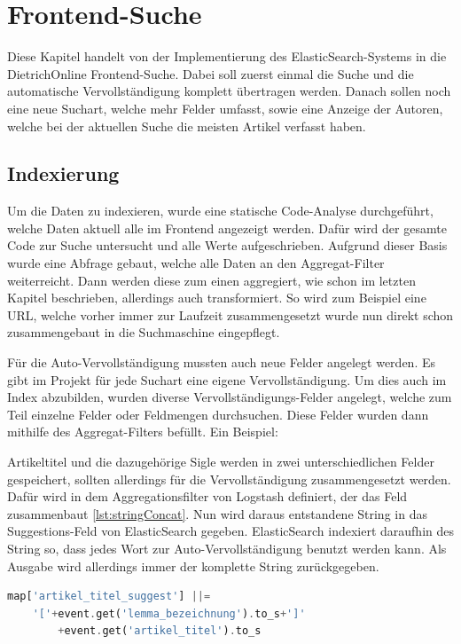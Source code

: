 \chapter{Frontend-Suche}

Diese Kapitel handelt von der Implementierung des ElasticSearch-Systems in die DietrichOnline Frontend-Suche. Dabei soll zuerst einmal die Suche und die automatische Vervollständigung komplett übertragen werden. Danach sollen noch eine neue Suchart, welche mehr Felder umfasst, sowie eine Anzeige der Autoren, welche bei der aktuellen Suche die meisten Artikel verfasst haben.

\section{Indexierung}

Um die Daten zu indexieren, wurde eine statische Code-Analyse durchgeführt, welche Daten aktuell alle im Frontend angezeigt werden. Dafür wird der gesamte Code zur Suche untersucht und alle Werte aufgeschrieben. Aufgrund dieser Basis wurde eine Abfrage gebaut, welche alle Daten an den Aggregat-Filter weiterreicht. Dann werden diese zum einen aggregiert, wie schon im letzten Kapitel beschrieben, allerdings auch transformiert. So wird zum Beispiel eine URL, welche vorher immer zur Laufzeit zusammengesetzt wurde nun direkt schon zusammengebaut in die Suchmaschine eingepflegt. 

Für die Auto-Vervollständigung mussten auch neue Felder angelegt werden. Es gibt im Projekt für jede Suchart eine eigene Vervollständigung. Um dies auch im Index abzubilden, wurden diverse Vervollständigungs-Felder angelegt, welche zum Teil einzelne Felder oder Feldmengen durchsuchen. Diese Felder wurden dann mithilfe des Aggregat-Filters befüllt. Ein Beispiel:

Artikeltitel und die dazugehörige Sigle werden in zwei unterschiedlichen Felder gespeichert, sollten allerdings für die Vervollständigung zusammengesetzt werden.
Dafür wird in dem Aggregationsfilter von Logstash definiert, der das Feld zusammenbaut \ref{lst:stringConcat}. Nun wird daraus entstandene String in das Suggestions-Feld von ElasticSearch gegeben. ElasticSearch indexiert daraufhin des String so, dass jedes Wort zur Auto-Vervollständigung benutzt werden kann. Als Ausgabe wird allerdings immer der komplette String zurückgegeben.

\begin{lstlisting}[language=PHP, frame=single, label={lst:stringConcat}] 
map['artikel_titel_suggest'] ||= 
    '['+event.get('lemma_bezeichnung').to_s+']'
        +event.get('artikel_titel').to_s
\end{lstlisting}

